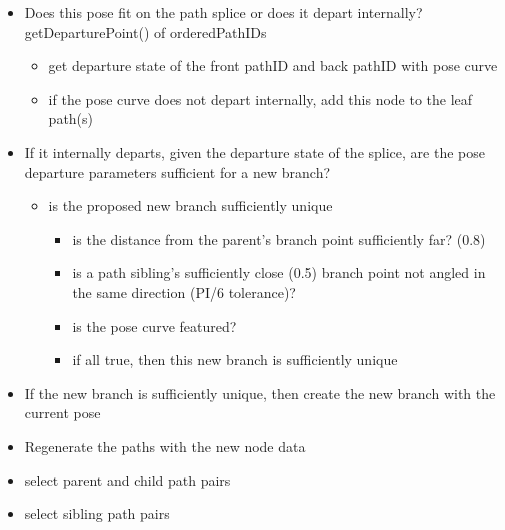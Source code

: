 \begin{itemize}
\item Does this pose fit on the path splice or does it depart internally?
getDeparturePoint() of orderedPathIDs

\begin{itemize}
\item get departure state of the front pathID and back pathID with pose curve

\item if the pose curve does not depart internally, add this node to the leaf path(s)

\end{itemize}

\item If it internally departs, given the departure state of the splice, are the pose departure parameters sufficient for a new branch?

\begin{itemize}
\item is the proposed new branch sufficiently unique

\begin{itemize}
\item is the distance from the parent's branch point sufficiently far? (0.8)

\item is a path sibling's sufficiently close (0.5) branch point not angled in the same direction (PI\slash 6 tolerance)?

\item is the pose curve featured?

\item if all true, then this new branch is sufficiently unique

\end{itemize}

\end{itemize}

\item If the new branch is sufficiently unique, then create the new branch with the current pose

\item Regenerate the paths with the new node data

\item select parent and child path pairs

\item select sibling path pairs

\end{itemize}

